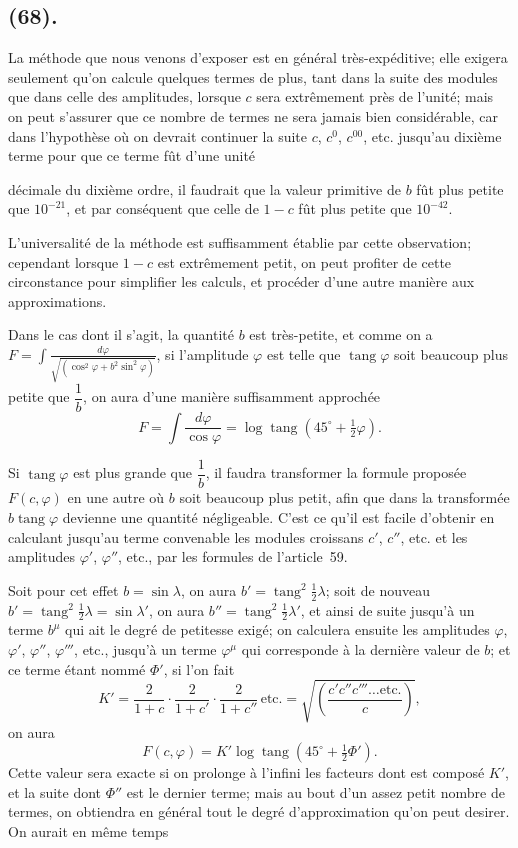 \documentclass{article}
\begin{document}
\subsection*{(68).}

La méthode que nous venons d'exposer est en général très-expéditive; elle exigera seulement qu'on calcule quelques termes de plus, tant dans la suite des modules que dans celle des amplitudes, lorsque $c$ sera extrêmement près de l'unité; mais on peut s'assurer que ce nombre de termes ne sera jamais bien considérable, car dans l'hypothèse où on devrait continuer la suite $c$, $c^{0}$, $c^{00}$, etc. jusqu'au dixième terme pour que ce terme fût d'une unité

décimale du dixième ordre, il faudrait que la valeur primitive de $b$ fût plus petite que $10^{-21}$, et par conséquent que celle de $1-c$ fût plus petite que $10^{-42}$.

L'universalité de la méthode est suffisamment établie par cette observation; cependant lorsque $1-c$ est extrêmement petit, on peut profiter de cette circonstance pour simplifier les calculs, et procéder d'une autre manière aux approximations.

Dans le cas dont il s'agit, la quantité $b$ est très-petite, et comme on a $F=\displaystyle\int\frac{d\varphi}{\sqrt{(\cos^{2}\varphi+b^{2}\sin^{2}\varphi)}}$, si l'amplitude $\varphi$ est telle que $\operatorname{tang}\varphi$ soit beaucoup plus petite que $\dfrac{1}{b}$, on aura d'une manière suffisamment approchée
\[ F=\int\frac{d\varphi}{\cos\varphi}=\log\operatorname{tang}(45^{\circ}+\tfrac{1}{2}\varphi). \]

Si $\operatorname{tang}\varphi$ est plus grande que $\dfrac{1}{b}$, il faudra transformer la formule proposée $F(c,\varphi)$ en une autre où $b$ soit beaucoup plus petit, afin que dans la transformée $b\operatorname{tang}\varphi$ devienne une quantité négligeable. C'est ce qu'il est facile d'obtenir en calculant jusqu'au terme convenable les modules croissans $c'$, $c''$, etc. et les amplitudes $\varphi'$, $\varphi''$, etc., par les formules de l'article~59.

Soit pour cet effet $b=\sin\lambda$, on aura $b'=\operatorname{tang}^{2}\frac{1}{2}\lambda$; soit de nouveau $b'=\operatorname{tang}^{2}\frac{1}{2}\lambda=\sin\lambda'$, on aura $b''=\operatorname{tang}^{2}\frac{1}{2}\lambda'$, et ainsi de suite jusqu'à un terme $b^{\mu}$ qui ait le degré de petitesse exigé; on calculera ensuite les amplitudes $\varphi$, $\varphi'$, $\varphi''$, $\varphi'''$, etc., jusqu'à un terme $\varphi^{\mu}$ qui corresponde à la dernière valeur de $b$; et ce terme étant nommé $\Phi'$, si l'on fait
\[ K'=\frac{2}{1+c}\cdot\frac{2}{1+c'}\cdot\frac{2}{1+c''}\,\text{etc.}=\sqrt{\left(\frac{c'c''c'''\ldots\text{etc.}}{c}\right)}, \]
on aura
\[ F(c,\varphi)=K'\log\operatorname{tang}(45^{\circ}+\tfrac{1}{2}\Phi'). \]
Cette valeur sera exacte si on prolonge à l'infini les facteurs dont est composé $K'$, et la suite dont $\Phi''$ est le dernier terme; mais au bout d'un assez petit nombre de termes, on obtiendra en général tout le degré d'approximation qu'on peut desirer. On aurait en même temps
\end{document}
